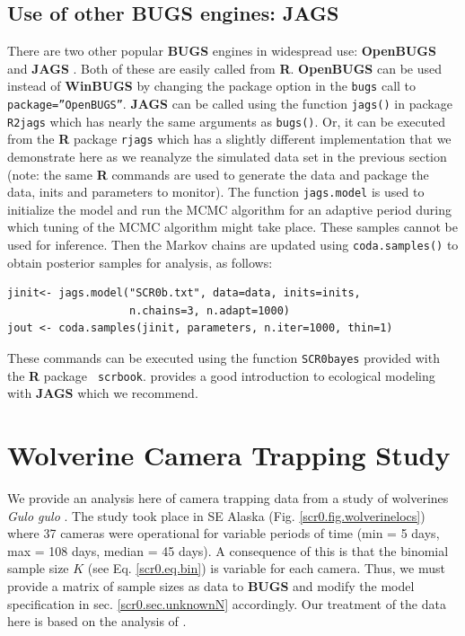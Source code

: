 \subsection{Use of other \textbf{BUGS} engines: {\bf JAGS}}

There are two other popular {\bf BUGS} engines in widespread use: {\bf
  OpenBUGS} \citep{thomas_etal:2006} and {\bf JAGS}
\citep{plummer:2003}. Both of these are easily called from {\bf
  R}. {\bf OpenBUGS} can be used instead of {\bf WinBUGS} by changing
the package option in the \mbox{\tt bugs} call to \mbox{\tt
  package=''OpenBUGS''}.  {\bf JAGS} can be called using the function
\mbox{\tt jags()} in package \mbox{\tt R2jags} which has nearly the
same arguments as \mbox{\tt bugs()}.  Or, it can be executed from
the {\bf R}
package
 \mbox{\tt rjags} \citep{plummer:2009} which has a slightly
different implementation that we demonstrate here as we reanalyze the
simulated data set in the previous section (note: the same {\bf R}
commands are used to generate the data and package the data, inits and
parameters to monitor). The function \mbox{\tt jags.model} is used to
initialize the model and run the MCMC algorithm for an adaptive period
during which tuning of the MCMC algorithm might take place.  These
samples cannot be used for inference.  Then the Markov chains are
updated using \mbox{\tt coda.samples()} to obtain posterior samples
for analysis, as follows:
{\small
\begin{verbatim}
jinit<- jags.model("SCR0b.txt", data=data, inits=inits,
                   n.chains=3, n.adapt=1000)
jout <- coda.samples(jinit, parameters, n.iter=1000, thin=1)
\end{verbatim}
}
These commands can be executed
using the function
\mbox{\tt SCR0bayes} provided with the {\bf R} package \mbox{\tt
  scrbook}. \citet{hobbs:2011} provides a good introduction to
ecological modeling with {\bf JAGS} which we recommend.



\section{Wolverine Camera Trapping Study}
\label{scr0.sec.wolverine}

We provide an analysis here of camera trapping data from a study of
wolverines \emph{Gulo gulo}
\citep{magoun_etal:2011, royle_etal:2011jwm}. The study took place in
SE Alaska (Fig. \ref{scr0.fig.wolverinelocs}) where 37 cameras were
operational for variable periods of time (min = 5 days, max = 108
days, median = 45 days).  A consequence of this is that the binomial
sample size $K$ (see Eq. \ref{scr0.eq.bin}) is variable for each
camera. Thus, we must provide a matrix of sample sizes as data to {\bf
  BUGS} and modify the model specification in
sec.
\ref{scr0.sec.unknownN} accordingly. Our treatment of the data
here is based on the analysis of \citet{royle_etal:2011jwm}.

